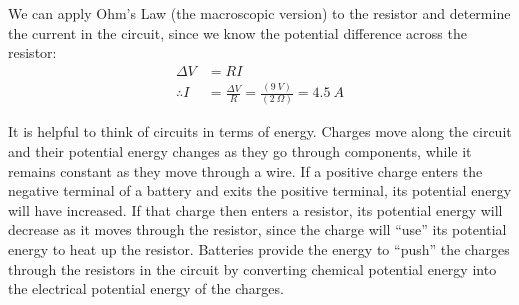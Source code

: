 We can apply Ohm's Law (the macroscopic version) to the resistor and determine the current in the circuit, since we know the potential difference across the resistor:
\begin{align*}
\Delta V&=RI\\
\therefore I&=\frac{\Delta V}{R}=\frac{(\SI{9}{V})}{(\SI{2}{\Omega})}=\SI{4.5}{A}
\end{align*}

It is helpful to think of circuits in terms of energy. Charges move along the circuit and their potential energy changes as they go through components, while it remains constant as they move through a wire. If a positive charge enters the negative terminal of a battery and exits the positive terminal, its potential energy will have increased. If that charge then enters a resistor, its potential energy will decrease as it moves through the resistor, since the charge will ``use'' its potential energy to heat up the resistor. Batteries provide the energy to ``push'' the charges through the resistors in the circuit by converting chemical potential energy into the electrical potential energy of the charges.

